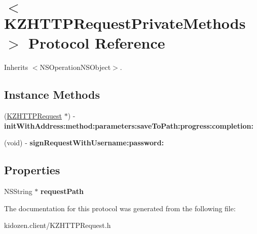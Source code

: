 \hypertarget{protocol_k_z_h_t_t_p_request_private_methods-p}{\section{$<$K\-Z\-H\-T\-T\-P\-Request\-Private\-Methods$>$ Protocol Reference}
\label{protocol_k_z_h_t_t_p_request_private_methods-p}
}


Inherits $<$\-N\-S\-Operation\-N\-S\-Object$>$.

\subsection*{Instance Methods}
\begin{DoxyCompactItemize}
\item 
\hypertarget{protocol_k_z_h_t_t_p_request_private_methods-p_a61381467e17d707a1df960e7c8981066}{(\hyperlink{interface_k_z_h_t_t_p_request}{K\-Z\-H\-T\-T\-P\-Request} $\ast$) -\/ {\bfseries init\-With\-Address\-:method\-:parameters\-:save\-To\-Path\-:progress\-:completion\-:}}\label{protocol_k_z_h_t_t_p_request_private_methods-p_a61381467e17d707a1df960e7c8981066}

\item 
\hypertarget{protocol_k_z_h_t_t_p_request_private_methods-p_a9985395fff4aa1913db9e4c5ad0eaf86}{(void) -\/ {\bfseries sign\-Request\-With\-Username\-:password\-:}}\label{protocol_k_z_h_t_t_p_request_private_methods-p_a9985395fff4aa1913db9e4c5ad0eaf86}

\end{DoxyCompactItemize}
\subsection*{Properties}
\begin{DoxyCompactItemize}
\item 
\hypertarget{protocol_k_z_h_t_t_p_request_private_methods-p_a886d6a1f90383d482c37d8a348166520}{N\-S\-String $\ast$ {\bfseries request\-Path}}\label{protocol_k_z_h_t_t_p_request_private_methods-p_a886d6a1f90383d482c37d8a348166520}

\end{DoxyCompactItemize}


The documentation for this protocol was generated from the following file\-:\begin{DoxyCompactItemize}
\item 
kidozen.\-client/K\-Z\-H\-T\-T\-P\-Request.\-h\end{DoxyCompactItemize}
